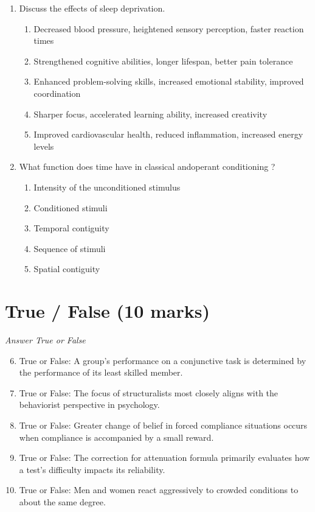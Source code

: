 \documentclass[12pt]{article}
\begin{document}
\begin{enumerate}[label=\arabic*.]
\begin{enumerate}[label=(\alph*)]
\end{enumerate}
\item Discuss the effects of sleep deprivation.
\begin{enumerate}[label=(\alph*)]
    \item Decreased blood pressure, heightened sensory perception, faster reaction times
    \item Strengthened cognitive abilities, longer lifespan, better pain tolerance
    \item Enhanced problem-solving skills, increased emotional stability, improved coordination
    \item Sharper focus, accelerated learning ability, increased creativity
    \item Improved cardiovascular health, reduced inflammation, increased energy levels
\end{enumerate}
\item What function does time have in classical andoperant conditioning ?
\begin{enumerate}[label=(\alph*)]
    \item Intensity of the unconditioned stimulus
    \item Conditioned stimuli
    \item Temporal contiguity
    \item Sequence of stimuli
    \item Spatial contiguity
\end{enumerate}
\end{enumerate}

\section*{True / False (10 marks)}
\textit{Answer True or False}
\begin{enumerate}[label=\arabic*.]
\setcounter{enumi}{5}
\item True or False: A group's performance on a conjunctive task is determined by the performance of its least skilled member.
\item True or False: The focus of structuralists most closely aligns with the behaviorist perspective in psychology.
\item True or False: Greater change of belief in forced compliance situations occurs when compliance is accompanied by a small reward.
\item True or False: The correction for attenuation formula primarily evaluates how a test's difficulty impacts its reliability.
\item True or False: Men and women react aggressively to crowded conditions to about the same degree.
\end{enumerate}
\end{document}
